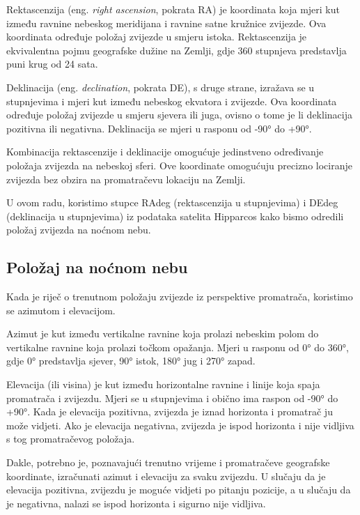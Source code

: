 \documentclass[a4paper,12pt]{article}
\begin{document}
Rektascenzija (eng. \emph{right ascension}, pokrata RA) je koordinata koja mjeri kut između ravnine nebeskog meridijana i ravnine satne kružnice zvijezde. Ova koordinata određuje položaj zvijezde u smjeru istoka. Rektascenzija je ekvivalentna pojmu geografske dužine na Zemlji, gdje 360 stupnjeva predstavlja puni krug od 24 sata.

Deklinacija (eng. \emph{declination}, pokrata DE), s druge strane, izražava se u stupnjevima i mjeri kut između nebeskog ekvatora i zvijezde. Ova koordinata određuje položaj zvijezde u smjeru sjevera ili juga, ovisno o tome je li deklinacija pozitivna ili negativna. Deklinacija se mjeri u rasponu od -90° do +90°.

Kombinacija rektascenzije i deklinacije omogućuje jedinstveno određivanje položaja zvijezda na nebeskoj sferi. Ove koordinate omogućuju precizno lociranje zvijezda bez obzira na promatračevu lokaciju na Zemlji.

U ovom radu, koristimo stupce RAdeg (rektascenzija u stupnjevima) i DEdeg (deklinacija u stupnjevima) iz podataka satelita Hipparcos kako bismo odredili položaj zvijezda na noćnom nebu.

\subsection{Položaj na noćnom nebu}
Kada je riječ o trenutnom položaju zvijezde iz perspektive promatrača, koristimo se azimutom i elevacijom.

Azimut je kut između vertikalne ravnine koja prolazi nebeskim polom do vertikalne ravnine koja prolazi točkom opažanja. Mjeri u rasponu od 0° do 360°, gdje 0° predstavlja sjever, 90° istok, 180° jug i 270° zapad.

Elevacija (ili visina) je kut između horizontalne ravnine i linije koja spaja promatrača i zvijezdu. Mjeri se u stupnjevima i obično ima raspon od -90° do +90°. Kada je elevacija pozitivna, zvijezda je iznad horizonta i promatrač ju može vidjeti. Ako je elevacija negativna, zvijezda je ispod horizonta i nije vidljiva s tog promatračevog položaja.

Dakle, potrebno je, poznavajući trenutno vrijeme i promatračeve geografske koordinate, izračunati azimut i elevaciju za svaku zvijezdu. U slučaju da je elevacija pozitivna, zvijezdu je moguće vidjeti po pitanju pozicije, a u slučaju da je negativna, nalazi se ispod horizonta i sigurno nije vidljiva.
\end{document}
